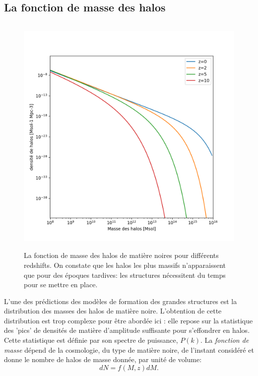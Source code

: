\subsection{La fonction de masse des halos}
\begin{figure}[htbp]
	\centering
		\includegraphics[height=12cm]{figs/hmf.png}
	\caption[La fonction de masse des halos de matière noires pour différents redshifts]{La fonction de masse des halos de matière noires pour différents redshifts. On constate que les halos les plus massifs n'apparaissent que pour des époques tardives: les structures nécessitent du temps pour se mettre en place.} 
	\label{f:hmf}
\end{figure}
L'une des prédictions des modèles de formation des grandes structures est la distribution des masses des halos de matière noire. L'obtention de cette distribution est trop complexe pour être abordée ici : elle repose sur la statistique des 'pics' de densités de matière d'amplitude suffisante pour s'effondrer en halos. Cette statistique est définie par son spectre de puissance, $P(k)$. La \textit{fonction de masse} dépend de la cosmologie, du type de matière noire, de l'instant considéré et donne le nombre de halos de masse donnée, par unité de volume:
\begin{equation}
dN=f(M,z)dM.
\end{equation}

